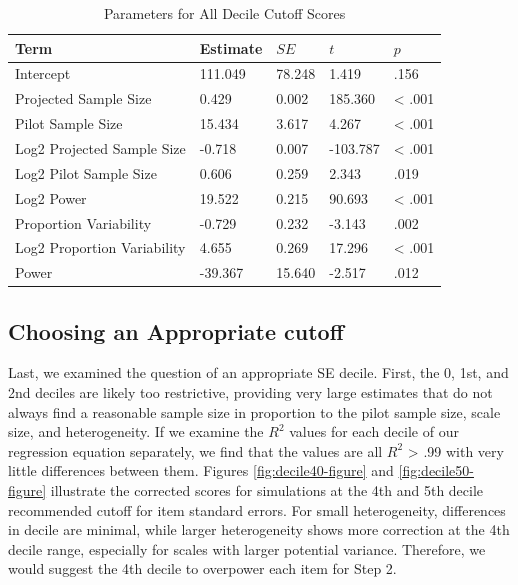 \documentclass[
  man]{apa7}
\begin{document}
\begin{table}[tbp]

\begin{center}
\begin{threeparttable}

\caption{\label{tab:table-correction}Parameters for All Decile Cutoff Scores}

\begin{tabular}{lllll}
\toprule
Term & Estimate & $SE$ & $t$ & $p$\\
\midrule
Intercept & 111.049 & 78.248 & 1.419 & .156\\
Projected Sample Size & 0.429 & 0.002 & 185.360 & < .001\\
Pilot Sample Size & 15.434 & 3.617 & 4.267 & < .001\\
Log2 Projected Sample Size & -0.718 & 0.007 & -103.787 & < .001\\
Log2 Pilot Sample Size & 0.606 & 0.259 & 2.343 & .019\\
Log2 Power & 19.522 & 0.215 & 90.693 & < .001\\
Proportion Variability & -0.729 & 0.232 & -3.143 & .002\\
Log2 Proportion Variability & 4.655 & 0.269 & 17.296 & < .001\\
Power & -39.367 & 15.640 & -2.517 & .012\\
\bottomrule
\end{tabular}

\end{threeparttable}
\end{center}

\end{table}

\subsection{Choosing an Appropriate cutoff}\label{choosing-an-appropriate-cutoff}

Last, we examined the question of an appropriate SE decile. First, the 0, 1st, and 2nd deciles are likely too restrictive, providing very large estimates that do not always find a reasonable sample size in proportion to the pilot sample size, scale size, and heterogeneity. If we examine the \(R^2\) values for each decile of our regression equation separately, we find that the values are all \(R^2\) \textgreater{} .99 with very little differences between them. Figures \ref{fig:decile40-figure} and \ref{fig:decile50-figure} illustrate the corrected scores for simulations at the 4th and 5th decile recommended cutoff for item standard errors. For small heterogeneity, differences in decile are minimal, while larger heterogeneity shows more correction at the 4th decile range, especially for scales with larger potential variance. Therefore, we would suggest the 4th decile to overpower each item for Step 2.
\end{document}
